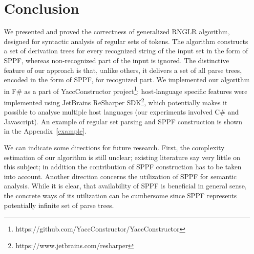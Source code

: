 \section{Conclusion}
%

We presented and proved the correctness of generalized RNGLR algorithm, designed for syntactic analysis of regular sets of
tokens. The algorithm constructs a set of derivation trees for every recognized string of the input set in the form of SPPF, 
whereas non-recognized part of the input is ignored. The distinctive feature of our approach is that, unlike others, it 
delivers a set of all parse trees, encoded in the form of SPPF, for recognized part. We implemented our algorithm in F\# as a part of YaccConstructor 
project\footnote{https://github.com/YaccConstructor/YaccConstructor}; host-language specific features were implemented
using JetBrains ReSharper SDK\footnote{https://www.jetbrains.com/resharper}, which potentially makes it possible to
analyse multiple host languages (our experiments involved C\# and Javascript). An example of regular set parsing and
SPPF construction is shown in the Appendix~\ref{example}.

We can indicate some directions for future research. First, the complexity estimation of our algorithm is still unclear; existing
literature say very little on this subject; in addition the contribution of SPPF construction has to be taken into account. 
Another direction concerns the utilization of SPPF for semantic analysis. While it is clear, that availability of SPPF 
is beneficial in general sense, the concrete ways of its utilization can be cumbersome since SPPF represents 
potentially infinite set of parse trees. 

